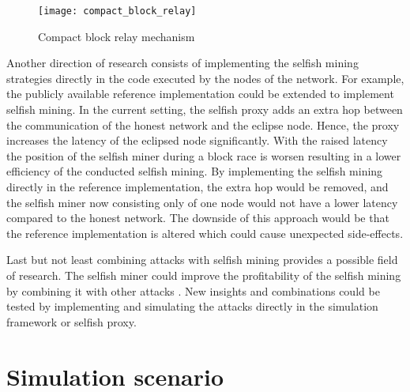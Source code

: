 \begin{figure}[t]
\texttt{[image: compact\_block\_relay]}
\centering
\caption{Compact block relay mechanism \cite{bip152}}
\label{fig:compact_block_relay}
\end{figure}

Another direction of research consists of implementing the selfish mining strategies directly in the code executed by the nodes of the network.
For example, the publicly available reference implementation could be extended to implement selfish mining.
In the current setting, the selfish proxy adds an extra hop between the communication of the honest network and the eclipse node.
Hence, the proxy increases the latency of the eclipsed node significantly.
With the raised latency the position of the selfish miner during a block race is worsen resulting in a lower efficiency of the conducted selfish mining.
By implementing the selfish mining directly in the reference implementation, the extra hop would be removed, and the selfish miner now consisting only of one node would not have a lower latency compared to the honest network.
The downside of this approach would be that the reference implementation is altered which could cause unexpected side-effects.

Last but not least combining attacks with selfish mining provides a possible field of research.
The selfish miner could improve the profitability of the selfish mining by combining it with other attacks \cite{gervais2016security, sapirshtein2016optimal, nayak2016stubborn, gervais2015tampering}.
New insights and combinations could be tested by implementing and simulating the attacks directly in the simulation framework or selfish proxy.

\section{Simulation scenario}

